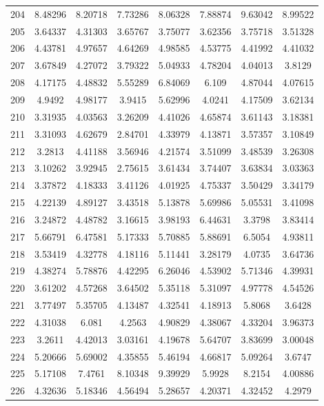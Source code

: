 \begin{center}
\begin{longtable}{cccccccc}
204 & 8.48296 & 8.20718 & 7.73286 & 8.06328 & 7.88874 & 9.63042 & 8.99522\\
205 & 3.64337 & 4.31303 & 3.65767 & 3.75077 & 3.62356 & 3.75718 & 3.51328\\
206 & 4.43781 & 4.97657 & 4.64269 & 4.98585 & 4.53775 & 4.41992 & 4.41032\\
207 & 3.67849 & 4.27072 & 3.79322 & 5.04933 & 4.78204 & 4.04013 & 3.8129\\
208 & 4.17175 & 4.48832 & 5.55289 & 6.84069 & 6.109 & 4.87044 & 4.07615\\
209 & 4.9492 & 4.98177 & 3.9415 & 5.62996 & 4.0241 & 4.17509 & 3.62134\\
210 & 3.31935 & 4.03563 & 3.26209 & 4.41026 & 4.65874 & 3.61143 & 3.18381\\
211 & 3.31093 & 4.62679 & 2.84701 & 4.33979 & 4.13871 & 3.57357 & 3.10849\\
212 & 3.2813 & 4.41188 & 3.56946 & 4.21574 & 3.51099 & 3.48539 & 3.26308\\
213 & 3.10262 & 3.92945 & 2.75615 & 3.61434 & 3.74407 & 3.63834 & 3.03363\\
214 & 3.37872 & 4.18333 & 3.41126 & 4.01925 & 4.75337 & 3.50429 & 3.34179\\
215 & 4.22139 & 4.89127 & 3.43518 & 5.13878 & 5.69986 & 5.05531 & 3.41098\\
216 & 3.24872 & 4.48782 & 3.16615 & 3.98193 & 6.44631 & 3.3798 & 3.83414\\
217 & 5.66791 & 6.47581 & 5.17333 & 5.70885 & 5.88691 & 6.5054 & 4.93811\\
218 & 3.53419 & 4.32778 & 4.18116 & 5.11441 & 3.28179 & 4.0735 & 3.64736\\
219 & 4.38274 & 5.78876 & 4.42295 & 6.26046 & 4.53902 & 5.71346 & 4.39931\\
220 & 3.61202 & 4.57268 & 3.64502 & 5.35118 & 5.31097 & 4.97778 & 4.54526\\
221 & 3.77497 & 5.35705 & 4.13487 & 4.32541 & 4.18913 & 5.8068 & 3.6428\\
222 & 4.31038 & 6.081 & 4.2563 & 4.90829 & 4.38067 & 4.33204 & 3.96373\\
223 & 3.2611 & 4.42013 & 3.03161 & 4.19678 & 5.64707 & 3.83699 & 3.00048\\
224 & 5.20666 & 5.69002 & 4.35855 & 5.46194 & 4.66817 & 5.09264 & 3.6747\\
225 & 5.17108 & 7.4761 & 8.10348 & 9.39929 & 5.9928 & 8.2154 & 4.00886\\
226 & 4.32636 & 5.18346 & 4.56494 & 5.28657 & 4.20371 & 4.32452 & 4.2979\\

\end{longtable}
\end{center}
